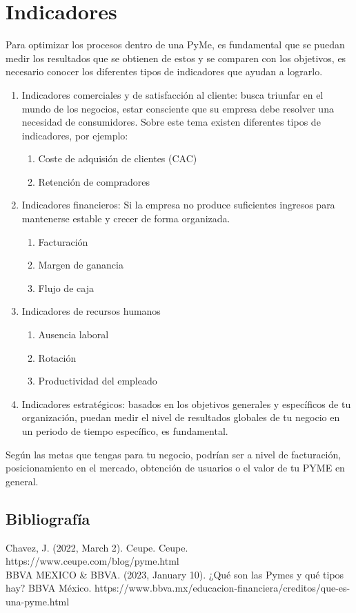 \documentclass[letterpaper,12pt]{article}
\begin{document}
\begin{sloppypar}
\section{Indicadores}
Para optimizar los procesos dentro de una PyMe, es fundamental que se puedan medir los resultados que se obtienen de estos y se comparen con los objetivos, es necesario conocer los diferentes tipos de indicadores que ayudan a lograrlo.

\begin{enumerate}
  \item Indicadores comerciales y de satisfacción al cliente: busca triunfar en el mundo de los negocios, estar consciente que su empresa debe resolver una necesidad de consumidores. 
  Sobre este tema existen diferentes tipos de indicadores, por ejemplo: 
  \begin{enumerate}
  	\item Coste de adquisión de clientes (CAC)
  	\item Retención de compradores 
  	\end{enumerate}
\item Indicadores financieros: Si la empresa no produce suficientes ingresos para mantenerse estable y crecer de forma organizada.
	\begin{enumerate}
		\item Facturación 
		\item Margen de ganancia 
		\item Flujo de caja
	\end{enumerate}
\item Indicadores de recursos humanos 
	\begin{enumerate}
		\item Ausencia laboral
		\item Rotación
		\item Productividad del empleado
	\end{enumerate}
\item Indicadores estratégicos: basados en los objetivos generales y específicos de tu organización, puedan medir el nivel de resultados globales de tu negocio en un periodo de tiempo específico, es fundamental.
\end{enumerate}

Según las metas que tengas para tu negocio, podrían ser a nivel de facturación, posicionamiento en el mercado, obtención de usuarios o el valor de tu PYME en general.




\subsection{Bibliografía}
Chavez, J. (2022, March 2). Ceupe. Ceupe. https://www.ceupe.com/blog/pyme.html
\vspace{0.3cm}\\ 
BBVA MEXICO \& BBVA. (2023, January 10). ¿Qué son las Pymes y qué tipos hay? BBVA México. https://www.bbva.mx/educacion-financiera/creditos/que-es-una-pyme.html

\end{sloppypar}
\end{document}
